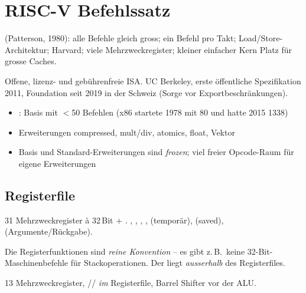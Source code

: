 \section{RISC-V Befehlssatz}
\label{sec:riscv}

 (Patterson, 1980): alle Befehle gleich gross; ein
Befehl pro Takt; Load/Store-Architektur; Harvard; viele
Mehrzweckregister; kleiner einfacher Kern \ra Platz für grosse Caches.

 Offene, lizenz- und gebührenfreie ISA. UC Berkeley, erste
öffentliche Spezifikation 2011, Foundation seit 2019 in der Schweiz
(Sorge vor Exportbeschränkungen).
\begin{itemize}
\item {}: Basis  mit $<$50 Befehlen
      (x86 startete 1978 mit 80 und hatte 2015 1338)
\item Erweiterungen  compressed,  mult/div,  atomics,
       float,  Vektor
\item Basis und Standard-Erweiterungen sind \emph{frozen}; viel freier
      Opcode-Raum für eigene Erweiterungen
\end{itemize}

\subsection{Registerfile}
31 Mehrzweckregister à 32\,Bit $+$  .
, , , ,  (temporär),
 (saved),  (Argumente/Rückgabe).
\begin{falle}
Die Registerfunktionen sind \emph{reine Konvention} -- es gibt z.\,B.\
keine 32-Bit-Maschinenbefehle für Stackoperationen. Der  liegt
\emph{ausserhalb} des Registerfiles.
\end{falle}
 13 Mehrzweckregister, // \emph{im}
Registerfile, Barrel Shifter vor der ALU.

